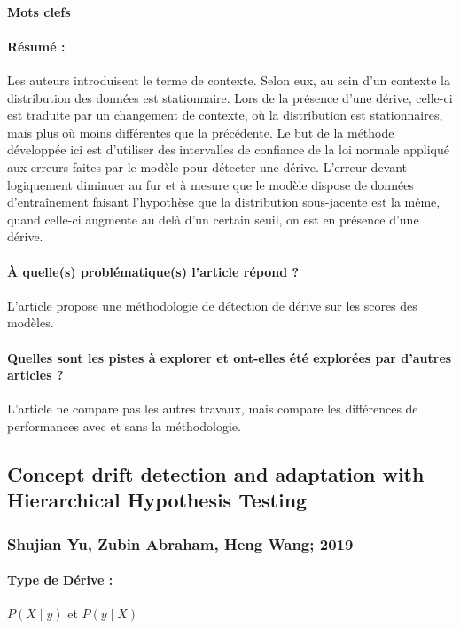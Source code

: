 \documentclass[11pt,a4paper]{report}
\begin{document}
\paragraph{Mots clefs}

\paragraph{Résumé :} Les auteurs introduisent le terme de contexte. Selon eux, au sein d'un contexte la distribution des données est stationnaire. Lors de la présence d'une dérive, celle-ci est traduite par un changement de contexte, où la distribution est stationnaires, mais plus où moins différentes que la précédente. Le but de la méthode développée ici est d'utiliser des intervalles de confiance de la loi normale appliqué aux erreurs faites par le modèle pour détecter une dérive. L'erreur devant logiquement diminuer au fur et à mesure que le modèle dispose de données d'entraînement faisant l'hypothèse que la distribution sous-jacente est la même, quand celle-ci augmente au delà d'un certain seuil, on est en présence d'une dérive.

\paragraph{À quelle(s) problématique(s) l'article répond ?} L'article propose une méthodologie de détection de dérive sur les scores des modèles.

\paragraph{Quelles sont les pistes à explorer et ont-elles  été explorées par d'autres articles ?} L'article ne compare pas les autres travaux, mais compare les différences de performances avec et sans la méthodologie.


\subsection{Concept drift detection and adaptation with Hierarchical Hypothesis Testing}
\subsubsection{Shujian Yu, Zubin Abraham, Heng Wang; 2019}

\paragraph{Type de Dérive :} $P(X\mid y)$ et $P(y \mid X)$
\end{document}
